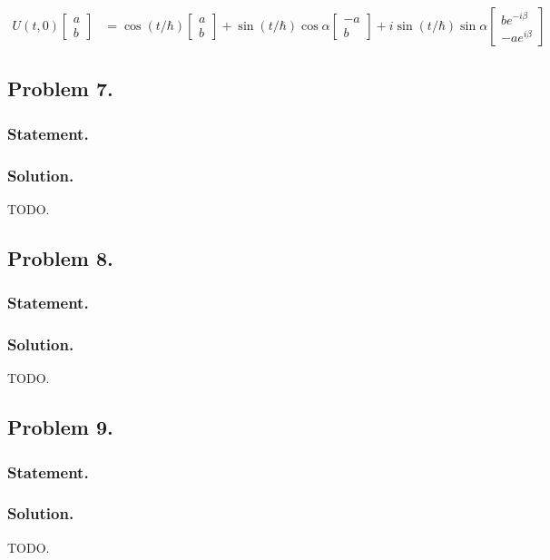 \begin{align}\label{eqn:desaiCh5:650}
U(t,0) 
\begin{bmatrix}
a \\
b
\end{bmatrix}
&=
\cos(t/\hbar)
\begin{bmatrix}
a \\
b
\end{bmatrix}
+ 
\sin(t/\hbar) \cos\alpha
\begin{bmatrix}
-a \\
b
\end{bmatrix}
+ i
\sin(t/\hbar) \sin\alpha
\begin{bmatrix}
b e^{-i\beta} \\
-a e^{i \beta}
\end{bmatrix}
\end{align}

\subsection{Problem 7.}
\subsubsection{Statement.}
\subsubsection{Solution.}

TODO.

\subsection{Problem 8.}
\subsubsection{Statement.}
\subsubsection{Solution.}

TODO.

\subsection{Problem 9.}
\subsubsection{Statement.}
\subsubsection{Solution.}

TODO.

\EndArticle
